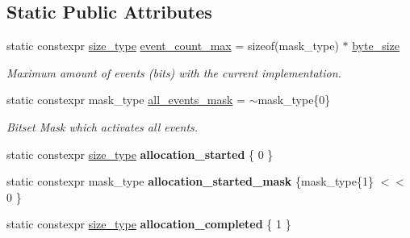 \subsection*{Static Public Attributes}
\begin{DoxyCompactItemize}
\item 
\mbox{\label{classgko_1_1log_1_1Logger_a8794cd4bf2fd4d24ba9879bdca884dab}} 
static constexpr \hyperlink{namespacegko_a6e5c95df0ae4e47aab2f604a22d98ee7}{size\+\_\+type} \hyperlink{classgko_1_1log_1_1Logger_a8794cd4bf2fd4d24ba9879bdca884dab}{event\+\_\+count\+\_\+max} = sizeof(mask\+\_\+type) $\ast$ \hyperlink{namespacegko_acae2e648052ec788bd8ba9e0192652a6}{byte\+\_\+size}
\begin{DoxyCompactList}\small\item\em Maximum amount of events (bits) with the current implementation. \end{DoxyCompactList}\item 
\mbox{\label{classgko_1_1log_1_1Logger_a02534863a2d2f92dfeb2c39038365532}} 
static constexpr mask\+\_\+type \hyperlink{classgko_1_1log_1_1Logger_a02534863a2d2f92dfeb2c39038365532}{all\+\_\+events\+\_\+mask} = $\sim$mask\+\_\+type\{0\}
\begin{DoxyCompactList}\small\item\em Bitset Mask which activates all events. \end{DoxyCompactList}\item 
\mbox{\label{classgko_1_1log_1_1Logger_ace3b82ca8660c0ead671596d73202427}} 
static constexpr \hyperlink{namespacegko_a6e5c95df0ae4e47aab2f604a22d98ee7}{size\+\_\+type} {\bfseries allocation\+\_\+started} \{ 0 \}
\item 
\mbox{\label{classgko_1_1log_1_1Logger_aaef05e13996ca7ecd1dbd9127b9cb25f}} 
static constexpr mask\+\_\+type {\bfseries allocation\+\_\+started\+\_\+mask} \{mask\+\_\+type\{1\} $<$$<$ 0 \}
\item 
\mbox{\label{classgko_1_1log_1_1Logger_a3b9b1283ce0ed8e741d0793b545a533a}} 
static constexpr \hyperlink{namespacegko_a6e5c95df0ae4e47aab2f604a22d98ee7}{size\+\_\+type} {\bfseries allocation\+\_\+completed} \{ 1 \}
\item 
\mbox{\label{classgko_1_1log_1_1Logger_a1df6710101d1955ffb3f86328c805d79}} 
$$
\end{DoxyCompactItemize}

